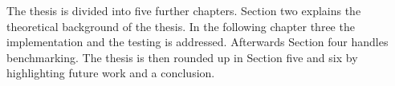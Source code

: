 The thesis is divided into five further chapters. Section two explains the theoretical background of the thesis. In the following chapter three the implementation and the testing is addressed. Afterwards Section four handles benchmarking. The thesis is then rounded up in Section five and six by highlighting future work and a conclusion.



